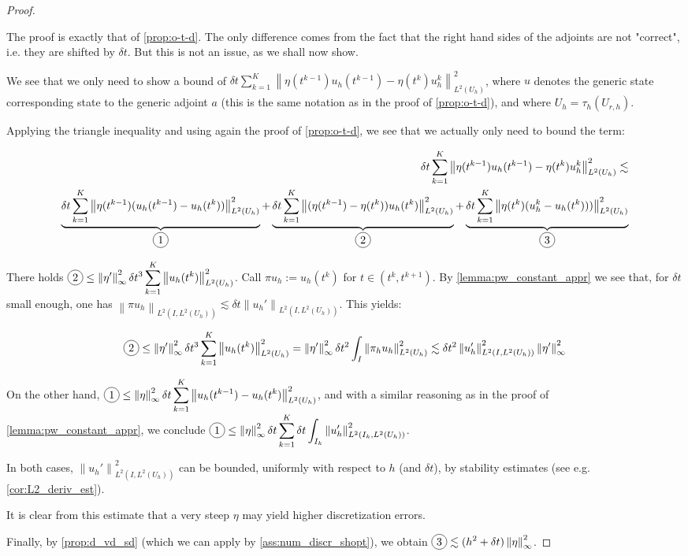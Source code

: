 \documentclass[english,a4paper,9pt,oneside]{scrbook}	%
\theoremstyle{break}
\newenvironment{mproof}[1][\proofname]{%
  \begin{proof}[#1]$ $\par\nobreak\ignorespaces
}{%
  \end{proof}
}
\renewcommand*{\proofname}{Proof}
\theoremstyle{remark}
\newcommand{\ds}{\displaystyle}
\newcommand{\norm}[1]{\left\lVert#1\right\rVert}
\newcommand*\circled[1]{\tikz[baseline=(char.base)]{
            \node[shape=circle,draw,inner sep=2pt] (char) {#1};}}
\begin{document}
\begin{mproof}
The proof is exactly that of \cref{prop:o-t-d}. The only difference comes from the fact that the right hand sides of the adjoints are not "correct", i.e. they are shifted by $\delta t$. But this is not an issue, as we shall now show. 

We see that we only need to show a bound of  $\delta t \sum_{k=1}^{K}\norm{\eta(t^{k-1})u_h(t^{k-1})-\eta(t^k)u_h^{k}}^2_{L^2(U_h)}$, where $u$ denotes the generic state corresponding state to the generic adjoint $a$ (this is the same notation as in the proof of \cref{prop:o-t-d}), and where $U_h=\tau_h(U_{r,h})$.

Applying the triangle inequality and using again the proof of \cref{prop:o-t-d}, we see that we actually only need to bound the term:

\begin{align*}
\delta t \sum_{k=1}^{K}\norm{\eta(t^{k-1})u_h(t^{k-1})-\eta(t^k)u_h^k}^2_{L^2(U_h)}\lesssim\\
\underbrace{\delta t \sum_{k=1}^{K}\norm{\eta(t^{k-1})(u_h(t^{k-1})-u_h(t^{k}))}^2_{L^2(U_h)}}_{\circled{1}}+
\underbrace{\delta t \sum_{k=1}^{K}\norm{(\eta(t^{k-1})-\eta(t^k))u_h(t^{k})}^2_{L^2(U_h)}}_{\circled{2}}+
\underbrace{\delta t \sum_{k=1}^{K}\norm{\eta(t^k)(u_h^k-u_h(t^k)))}^2_{L^2(U_h)}}_{\circled{3}}
\end{align*}

There holds $\ds  \circled{2} \leq \norm{\eta'}_\infty^2 \delta t^3 \sum_{k=1}^{K}\norm{u_h(t^{k})}^2_{L^2(U_h)}$. Call $\pi u_h := u_h(t^{k})$ for $t \in (t^k, t^{k+1})$. By \cref{lemma:pw_constant_appr} we see that, for $\delta t $ small enough, one has $\norm{\pi u_h}_{L^2(I, L^2(U_h))} \lesssim \delta t \norm{u_h'}_{L^2(I,L^2(U_h))}$. This yields:

\begin{align*}
	 \ds  \circled{2}\leq \norm{\eta'}_\infty^2 \delta t^3 \sum_{k=1}^{K}\norm{u_h(t^{k})}^2_{L^2(U_h)}  = \norm{\eta'}_\infty^2 \delta t^2 \int_I \norm{\pi_h u_h}^2_{L^2(U_h)}\lesssim \delta t^2 \norm{u_h'}_{L^2(I,L^2(U_h))}^2 \norm{\eta'}_\infty ^2
\end{align*}

On the other hand,  $\ds  \circled{1} \leq \norm{\eta}_\infty^2 \delta t \sum_{k=1}^{K}\norm{u_h(t^{k-1})-u_h(t^{k})}^2_{L^2(U_h)}$, and with a similar reasoning as in the proof of \cref{lemma:pw_constant_appr}, we conclude $\ds \circled{1} \leq \norm{\eta}_\infty^2 \delta t \sum_{k=1}^{K} \delta t \int_{I_k}\norm{u_h'}_{L^2(I_k , L^2(U_h))}^2$.

In both cases, $\norm{u_h'}_{L^2(I,L^2(U_h))}^2$ can be bounded, uniformly with respect to $h$ (and $\delta t$), by stability estimates (see e.g. \cref{cor:L2_deriv_est}).

It  is clear from this estimate that a very steep $\eta$ may yield higher discretization errors.

Finally, by \cref{prop:d_vd_sd} (which we can apply by \cref{ass:num_discr_shopt}), we obtain $\ds \circled{3} \lesssim (h^2+\delta t)\norm{\eta}_\infty^2 $.
\end{mproof}
\end{document}
